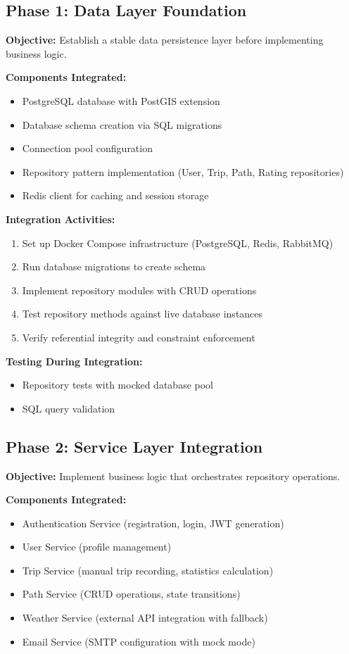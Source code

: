 \subsection{Phase 1: Data Layer Foundation}
\label{subsec:phase1_data_layer}

\textbf{Objective:} Establish a stable data persistence layer before implementing business logic.

\textbf{Components Integrated:}
\begin{itemize}
    \item PostgreSQL database with PostGIS extension
    \item Database schema creation via SQL migrations
    \item Connection pool configuration
    \item Repository pattern implementation (User, Trip, Path, Rating repositories)
    \item Redis client for caching and session storage
\end{itemize}

\textbf{Integration Activities:}
\begin{enumerate}
    \item Set up Docker Compose infrastructure (PostgreSQL, Redis, RabbitMQ)
    \item Run database migrations to create schema
    \item Implement repository modules with CRUD operations
    \item Test repository methods against live database instances
    \item Verify referential integrity and constraint enforcement
\end{enumerate}

\textbf{Testing During Integration:}
\begin{itemize}
    \item Repository tests with mocked database pool
    \item SQL query validation
\end{itemize}

\subsection{Phase 2: Service Layer Integration}
\label{subsec:phase2_service_layer}

\textbf{Objective:} Implement business logic that orchestrates repository operations.

\textbf{Components Integrated:}
\begin{itemize}
    \item Authentication Service (registration, login, JWT generation)
    \item User Service (profile management)
    \item Trip Service (manual trip recording, statistics calculation)
    \item Path Service (CRUD operations, state transitions)
    \item Weather Service (external API integration with fallback)
    \item Email Service (SMTP configuration with mock mode)
\end{itemize}

